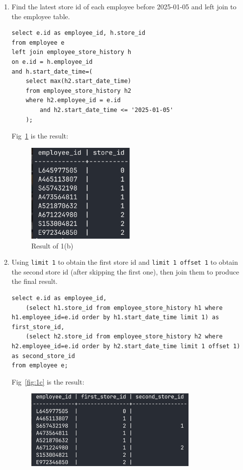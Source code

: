 \documentclass[12pt,a4paper]{article}
\begin{document}
\begin{enumerate}
\begin{enumerate}
        \item Find the latest store id of each employee before 2025-01-05 and left join to the employee table.
        \begin{verbatim}
select e.id as employee_id, h.store_id
from employee e
left join employee_store_history h
on e.id = h.employee_id
and h.start_date_time=(
    select max(h2.start_date_time)
    from employee_store_history h2
    where h2.employee_id = e.id
        and h2.start_date_time <= '2025-01-05'
    );           
        \end{verbatim}
        Fig~\ref{fig:1b} is the result:
        \begin{figure}[H]
            \centering
            \includegraphics[width=0.5\textwidth]{src/1b.png}
            \caption{Result of 1(b)}
            \label{fig:1b}
        \end{figure}
        \item Using \texttt{limit 1} to obtain the first store id and \texttt{limit 1 offset 1} to obtain the second store id (after skipping the first one), then join them to produce the final result.
        \begin{verbatim}
select e.id as employee_id,
    (select h1.store_id from employee_store_history h1 where h1.employee_id=e.id order by h1.start_date_time limit 1) as first_store_id,
    (select h2.store_id from employee_store_history h2 where h2.employee_id=e.id order by h2.start_date_time limit 1 offset 1) as second_store_id
from employee e;
        \end{verbatim}
        Fig~\ref{fig:1c} is the result:
        \begin{figure}[H]
            \centering
            \includegraphics[width=0.8\textwidth]{src/1c.png}

\end{figure}
\end{enumerate}
\end{enumerate}
\end{document}
